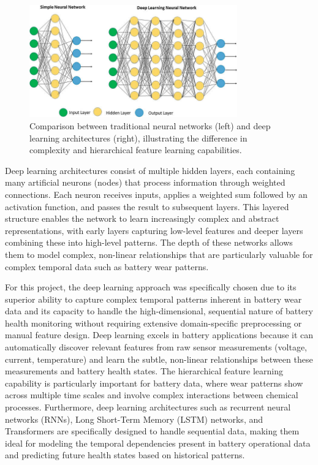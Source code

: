 \begin{figure}[htbp]
\centering
\includegraphics[width=0.8\textwidth]{imgs/neural_vs_deep.png}
\caption{Comparison between traditional neural networks (left) and deep learning architectures (right), illustrating the difference in complexity and hierarchical feature learning capabilities.}
\label{fig:neural_vs_deep}
\end{figure}

Deep learning architectures consist of multiple hidden layers, each containing many artificial neurons (nodes) that process information through weighted connections. Each neuron receives inputs, applies a weighted sum followed by an activation function, and passes the result to subsequent layers. This layered structure enables the network to learn increasingly complex and abstract representations, with early layers capturing low-level features and deeper layers combining these into high-level patterns. The depth of these networks allows them to model complex, non-linear relationships that are particularly valuable for complex temporal data such as battery wear patterns.

For this project, the deep learning approach was specifically chosen due to its superior ability to capture complex temporal patterns inherent in battery wear data and its capacity to handle the high-dimensional, sequential nature of battery health monitoring without requiring extensive domain-specific preprocessing or manual feature design. Deep learning excels in battery applications because it can automatically discover relevant features from raw sensor measurements (voltage, current, temperature) and learn the subtle, non-linear relationships between these measurements and battery health states. The hierarchical feature learning capability is particularly important for battery data, where wear patterns show across multiple time scales and involve complex interactions between chemical processes. Furthermore, deep learning architectures such as recurrent neural networks (RNNs), Long Short-Term Memory (LSTM) networks, and Transformers are specifically designed to handle sequential data, making them ideal for modeling the temporal dependencies present in battery operational data and predicting future health states based on historical patterns.



